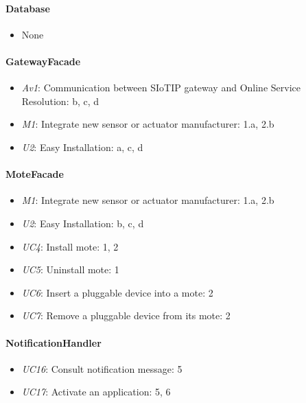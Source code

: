     \paragraph{Database}
        \begin{itemize}
          	\item None
        \end{itemize}

    \paragraph{GatewayFacade}
        \begin{itemize}
            \item \emph{Av1}: Communication between SIoTIP gateway and Online Service \\
                               Resolution: b, c, d
            \item \emph{M1}: Integrate new sensor or actuator manufacturer: 1.a, 2.b
            \item \emph{U2}: Easy Installation: a, c, d
    \end{itemize}

    \paragraph{MoteFacade}
        \begin{itemize}
            \item \emph{M1}: Integrate new sensor or actuator manufacturer: 1.a, 2.b
            \item \emph{U2}: Easy Installation: b, c, d
            \item \emph{UC4}: Install mote: 1, 2
            \item \emph{UC5}: Uninstall mote: 1
            \item \emph{UC6}: Insert a pluggable device into a mote: 2
            \item \emph{UC7}: Remove a pluggable device from its mote: 2
        \end{itemize}

    \paragraph{NotificationHandler}
        \begin{itemize}
            \item \emph{UC16}: Consult notification message: 5
            \item \emph{UC17}: Activate an application: 5, 6
        \end{itemize}

